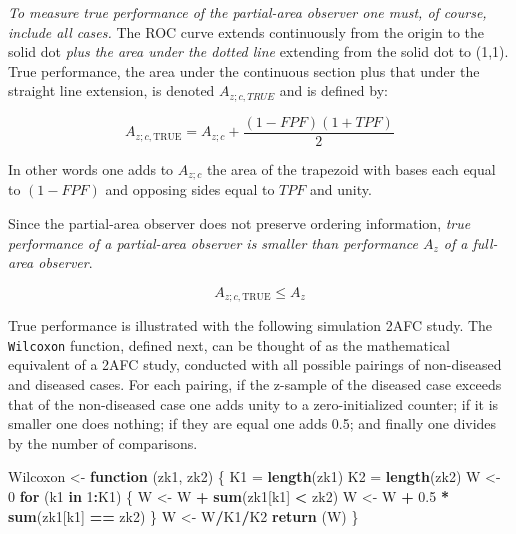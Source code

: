\documentclass[
]{book}
\newenvironment{Shaded}{\begin{snugshade}}{\end{snugshade}}
\newcommand{\ControlFlowTok}[1]{\textcolor[rgb]{0.13,0.29,0.53}{\textbf{#1}}}
\newcommand{\DecValTok}[1]{\textcolor[rgb]{0.00,0.00,0.81}{#1}}
\newcommand{\FloatTok}[1]{\textcolor[rgb]{0.00,0.00,0.81}{#1}}
\newcommand{\KeywordTok}[1]{\textcolor[rgb]{0.13,0.29,0.53}{\textbf{#1}}}
\newcommand{\NormalTok}[1]{#1}
\newcommand{\OperatorTok}[1]{\textcolor[rgb]{0.81,0.36,0.00}{\textbf{#1}}}
\newcommand{\StringTok}[1]{\textcolor[rgb]{0.31,0.60,0.02}{#1}}
\begin{document}
\emph{To measure true performance of the partial-area observer one must, of course, include all cases.} The ROC curve extends continuously from the origin to the solid dot \emph{plus the area under the dotted line} extending from the solid dot to (1,1). True performance, the area under the continuous section plus that under the straight line extension, is denoted \(A_{z;c,TRUE}\) and is defined by:

\begin{equation} 
A_{z;c,\text{TRUE}} = A_{z;c} + \frac {\left ( 1 - FPF \right ) \left ( 1 + TPF \right )}{2}
\label{eq:binormal-model-partial-area-true-performance}
\end{equation}

In other words one adds to \(A_{z;c}\) the area of the trapezoid with bases each equal to \((1 - FPF)\) and opposing sides equal to \(TPF\) and unity.

Since the partial-area observer does not preserve ordering information, \emph{true performance of a partial-area observer is smaller than performance \(A_z\) of a full-area observer}.

\begin{equation} 
A_{z;c,\text{TRUE}} \le A_{z}
\label{eq:binormal-model-true-performance-az-inequality}
\end{equation}

True performance is illustrated with the following simulation 2AFC study. The \texttt{Wilcoxon} function, defined next, can be thought of as the mathematical equivalent of a 2AFC study, conducted with all possible pairings of non-diseased and diseased cases. For each pairing, if the z-sample of the diseased case exceeds that of the non-diseased case one adds unity to a zero-initialized counter; if it is smaller one does nothing; if they are equal one adds 0.5; and finally one divides by the number of comparisons.

\begin{Shaded}
\begin{Highlighting}[numbers=left,,]
\NormalTok{Wilcoxon <-}\StringTok{ }\ControlFlowTok{function}\NormalTok{ (zk1, zk2)}
\NormalTok{\{}
\NormalTok{  K1 =}\StringTok{ }\KeywordTok{length}\NormalTok{(zk1)}
\NormalTok{  K2 =}\StringTok{ }\KeywordTok{length}\NormalTok{(zk2)}
\NormalTok{  W <-}\StringTok{ }\DecValTok{0}
    \ControlFlowTok{for}\NormalTok{ (k1 }\ControlFlowTok{in} \DecValTok{1}\OperatorTok{:}\NormalTok{K1) \{}
\NormalTok{      W <-}\StringTok{ }\NormalTok{W }\OperatorTok{+}\StringTok{ }\KeywordTok{sum}\NormalTok{(zk1[k1] }\OperatorTok{<}\StringTok{ }\NormalTok{zk2)}
\NormalTok{      W <-}\StringTok{ }\NormalTok{W }\OperatorTok{+}\StringTok{ }\FloatTok{0.5} \OperatorTok{*}\StringTok{ }\KeywordTok{sum}\NormalTok{(zk1[k1] }\OperatorTok{==}\StringTok{ }\NormalTok{zk2)}
\NormalTok{    \}}
\NormalTok{    W <-}\StringTok{ }\NormalTok{W}\OperatorTok{/}\NormalTok{K1}\OperatorTok{/}\NormalTok{K2}
  \KeywordTok{return}\NormalTok{ (W)}
\NormalTok{\}}
\end{Highlighting}
\end{Shaded}
\end{document}
